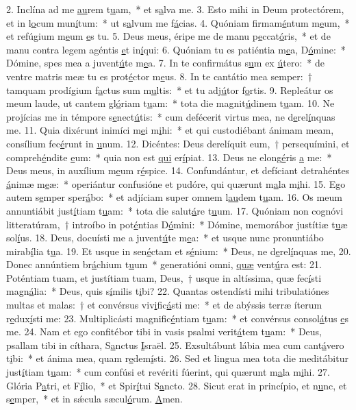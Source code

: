 2. Inclína ad me \uline{au}rem t\uline{u}am,~* et s\uline{a}lva me.
3. Esto mihi in Deum protectórem, et in l\uline{o}cum mun\uline{í}tum:~* ut s\uline{a}lvum me f\uline{á}cias.
4. Quóniam firmam\uline{é}ntum m\uline{e}um,~* et refúgium m\uline{e}um \uline{e}s tu.
5. Deus meus, éripe me de manu p\uline{e}ccat\uline{ó}ris,~* et de manu contra legem agéntis \uline{e}t in\uline{í}qui:
6. Quóniam tu es patiéntia m\uline{e}a, D\uline{ó}mine:~* Dómine, spes mea a juvent\uline{ú}te m\uline{e}a.
7. In te confirmátus s\uline{u}m ex \uline{ú}tero:~* de ventre matris meæ tu es prot\uline{é}ctor m\uline{e}us.
8. In te cantátio mea semper:~† tamquam prodígium f\uline{a}ctus sum m\uline{u}ltis:~* et tu adj\uline{ú}tor f\uline{o}rtis.
9. Repleátur os meum laude, ut cantem gl\uline{ó}riam t\uline{u}am:~* tota die magnit\uline{ú}dinem t\uline{u}am.
10. Ne projícias me in témpore s\uline{e}nect\uline{ú}tis:~* cum defécerit virtus mea, ne d\uline{e}rel\uline{í}nquas me.
11. Quia dixérunt inimíci m\uline{e}i m\uline{i}hi:~* et qui custodiébant ánimam meam, consílium fec\uline{é}runt in \uline{u}num.
12. Dicéntes: Deus derelíquit eum,~† persequímini, et compreh\uline{é}ndite \uline{e}um:~* quia non est \uline{qui} er\uline{í}piat.
13. Deus ne elong\uline{é}ris \uline{a} me:~* Deus meus, in auxílium m\uline{e}um r\uline{é}spice.
14. Confundántur, et defíciant detrahéntes \uline{á}nimæ m\uline{e}æ:~* operiántur confusióne et pudóre, qui quærunt m\uline{a}la m\uline{i}hi.
15. Ego autem s\uline{e}mper sper\uline{á}bo:~* et adjíciam super omnem l\uline{au}dem t\uline{u}am.
16. Os meum annuntiábit just\uline{í}tiam t\uline{u}am:~* tota die salut\uline{á}re t\uline{u}um.
17. Quóniam non cognóvi litteratúram,~† introíbo in pot\uline{é}ntias D\uline{ó}mini:~* Dómine, memorábor justítiæ t\uline{u}æ sol\uline{í}us.
18. Deus, docuísti me a juvent\uline{ú}te m\uline{e}a:~* et usque nunc pronuntiábo mirab\uline{í}lia t\uline{u}a.
19. Et usque in sen\uline{é}ctam et s\uline{é}nium:~* Deus, ne d\uline{e}rel\uline{í}nquas me,
20. Donec annúntiem br\uline{á}chium t\uline{u}um~* generatióni omni, \uline{quæ} vent\uline{ú}ra est:
21. Poténtiam tuam, et justítiam tuam, Deus,~† usque in altíssima, quæ fec\uline{í}sti magn\uline{á}lia:~* Deus, quis s\uline{í}milis t\uline{i}bi?
22. Quantas ostendísti mihi tribulatiónes multas et malas:~† et convérsus viv\uline{i}fic\uline{á}sti me:~* et de abýssis terræ íterum r\uline{e}dux\uline{í}sti me:
23. Multiplicásti magnific\uline{é}ntiam t\uline{u}am:~* et convérsus consol\uline{á}tus \uline{e}s me.
24. Nam et ego confitébor tibi in vasis psalmi verit\uline{á}tem t\uline{u}am:~* Deus, psallam tibi in cíthara, S\uline{a}nctus \uline{I}sraël.
25. Exsultábunt lábia mea cum cant\uline{á}vero t\uline{i}bi:~* et ánima mea, quam r\uline{e}dem\uline{í}sti.
26. Sed et lingua mea tota die meditábitur just\uline{í}tiam t\uline{u}am:~* cum confúsi et revériti fúerint, qui quærunt m\uline{a}la m\uline{i}hi.
27. Glória P\uline{a}tri, et F\uline{í}lio,~* et Spir\uline{í}tui S\uline{a}ncto.
28. Sicut erat in princípio, et n\uline{u}nc, et s\uline{e}mper,~* et in sǽcula sæcul\uline{ó}rum. \uline{A}men.

